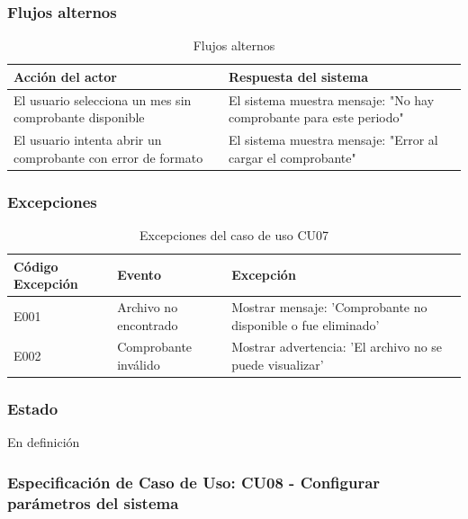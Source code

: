 \subsubsection*{Flujos alternos}
\begin{table}[h]
	\centering
	\caption{Flujos alternos}
	\begin{tabular}{|p{7cm}|p{7cm}|}
		\hline
		\textbf{Acción del actor}                                    & \textbf{Respuesta del sistema}                                     \\ \hline
		El usuario selecciona un mes sin comprobante disponible      & El sistema muestra mensaje: "No hay comprobante para este periodo" \\ \hline
		El usuario intenta abrir un comprobante con error de formato & El sistema muestra mensaje: "Error al cargar el comprobante"       \\ \hline
	\end{tabular}
\end{table}

\subsubsection*{Excepciones}
\begin{table}[h]
	\centering
	\caption{Excepciones del caso de uso CU07}
	\begin{tabular}{|p{3cm}|p{5cm}|p{5cm}|}
		\hline
		\textbf{Código Excepción} & \textbf{Evento}       & \textbf{Excepción}                                           \\ \hline
		E001                      & Archivo no encontrado & Mostrar mensaje: 'Comprobante no disponible o fue eliminado' \\ \hline
		E002                      & Comprobante inválido  & Mostrar advertencia: 'El archivo no se puede visualizar'     \\ \hline
	\end{tabular}
\end{table}

\subsubsection*{Estado}
En definición

\subsubsection*{Especificación de Caso de Uso: CU08 - Configurar parámetros del sistema}

